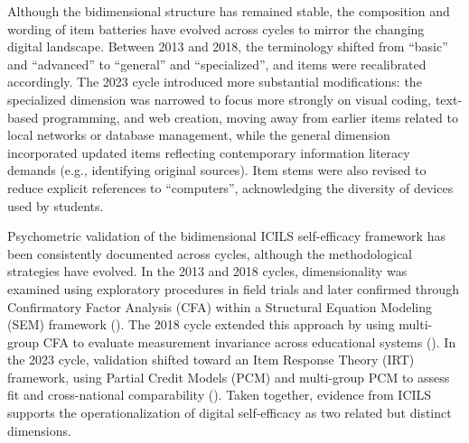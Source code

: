 \documentclass[
  letterpaper,
  DIV=11,
  numbers=noendperiod]{scrartcl}
\begin{document}
Although the bidimensional structure has remained stable, the
composition and wording of item batteries have evolved across cycles to
mirror the changing digital landscape. Between 2013 and 2018, the
terminology shifted from ``basic'' and ``advanced'' to ``general'' and
``specialized'', and items were recalibrated accordingly. The 2023 cycle
introduced more substantial modifications: the specialized dimension was
narrowed to focus more strongly on visual coding, text-based
programming, and web creation, moving away from earlier items related to
local networks or database management, while the general dimension
incorporated updated items reflecting contemporary information literacy
demands (e.g., identifying original sources). Item stems were also
revised to reduce explicit references to ``computers'', acknowledging
the diversity of devices used by students.

Psychometric validation of the bidimensional ICILS self-efficacy
framework has been consistently documented across cycles, although the
methodological strategies have evolved. In the 2013 and 2018 cycles,
dimensionality was examined using exploratory procedures in field trials
and later confirmed through Confirmatory Factor Analysis (CFA) within a
Structural Equation Modeling (SEM) framework
(). The 2018
cycle extended this approach by using multi-group CFA to evaluate
measurement invariance across educational systems
(). In the 2023
cycle, validation shifted toward an Item Response Theory (IRT)
framework, using Partial Credit Models (PCM) and multi-group PCM to
assess fit and cross-national comparability
(). Taken
together, evidence from ICILS supports the operationalization of digital
self-efficacy as two related but distinct dimensions.
\end{document}
